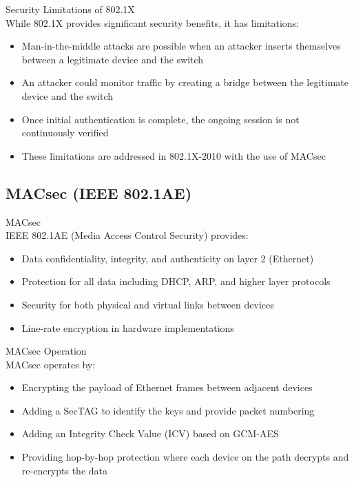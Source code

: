 \begin{theorem}{Security Limitations of 802.1X}\\
While 802.1X provides significant security benefits, it has limitations:
\begin{itemize}
    \item Man-in-the-middle attacks are possible when an attacker inserts themselves between a legitimate device and the switch
    \item An attacker could monitor traffic by creating a bridge between the legitimate device and the switch
    \item Once initial authentication is complete, the ongoing session is not continuously verified
    \item These limitations are addressed in 802.1X-2010 with the use of MACsec
\end{itemize}
\end{theorem}

\subsection{MACsec (IEEE 802.1AE)}

\begin{definition}{MACsec}\\
IEEE 802.1AE (Media Access Control Security) provides:
\begin{itemize}
    \item Data confidentiality, integrity, and authenticity on layer 2 (Ethernet)
    \item Protection for all data including DHCP, ARP, and higher layer protocols
    \item Security for both physical and virtual links between devices
    \item Line-rate encryption in hardware implementations
\end{itemize}
\end{definition}

\begin{concept}{MACsec Operation}\\
MACsec operates by:
\begin{itemize}
    \item Encrypting the payload of Ethernet frames between adjacent devices
    \item Adding a SecTAG to identify the keys and provide packet numbering
    \item Adding an Integrity Check Value (ICV) based on GCM-AES
    \item Providing hop-by-hop protection where each device on the path decrypts and re-encrypts the data
\end{itemize}
\end{concept}

